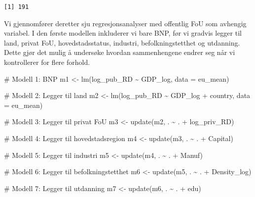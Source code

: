 \documentclass[
  letterpaper,
  DIV=11,
  numbers=noendperiod]{scrartcl}
\newenvironment{Shaded}{\begin{snugshade}}{\end{snugshade}}
\newcommand{\AttributeTok}[1]{\textcolor[rgb]{0.40,0.45,0.13}{#1}}
\newcommand{\CommentTok}[1]{\textcolor[rgb]{0.37,0.37,0.37}{#1}}
\newcommand{\FunctionTok}[1]{\textcolor[rgb]{0.28,0.35,0.67}{#1}}
\newcommand{\NormalTok}[1]{\textcolor[rgb]{0.00,0.23,0.31}{#1}}
\newcommand{\OtherTok}[1]{\textcolor[rgb]{0.00,0.23,0.31}{#1}}
\newcommand{\SpecialCharTok}[1]{\textcolor[rgb]{0.37,0.37,0.37}{#1}}
\begin{document}
\begin{verbatim}
[1] 191
\end{verbatim}

Vi gjennomfører deretter sju regresjonsanalyser med offentlig FoU som
avhengig variabel. I den første modellen inkluderer vi bare BNP, før vi
gradvis legger til land, privat FoU, hovedstadsstatus, industri,
befolkningstetthet og utdanning. Dette gjør det mulig å undersøke
hvordan sammenhengene endrer seg når vi kontrollerer for flere forhold.

\begin{Shaded}
\begin{Highlighting}[]
\CommentTok{\# Modell 1: BNP}
\NormalTok{m1 }\OtherTok{\textless{}{-}} \FunctionTok{lm}\NormalTok{(log\_pub\_RD }\SpecialCharTok{\textasciitilde{}}\NormalTok{ GDP\_log, }\AttributeTok{data =}\NormalTok{ eu\_mean)}

\CommentTok{\# Modell 2: Legger til land}
\NormalTok{m2 }\OtherTok{\textless{}{-}} \FunctionTok{lm}\NormalTok{(log\_pub\_RD }\SpecialCharTok{\textasciitilde{}}\NormalTok{ GDP\_log }\SpecialCharTok{+}\NormalTok{ country,}
         \AttributeTok{data =}\NormalTok{ eu\_mean)}

\CommentTok{\# Modell 3: Legger til privat FoU}
\NormalTok{m3 }\OtherTok{\textless{}{-}} \FunctionTok{update}\NormalTok{(m2, . }\SpecialCharTok{\textasciitilde{}}\NormalTok{ . }\SpecialCharTok{+}\NormalTok{ log\_priv\_RD)}

\CommentTok{\# Modell 4: Legger til hovedstadsregion}
\NormalTok{m4 }\OtherTok{\textless{}{-}} \FunctionTok{update}\NormalTok{(m3, . }\SpecialCharTok{\textasciitilde{}}\NormalTok{ . }\SpecialCharTok{+}\NormalTok{ Capital)}

\CommentTok{\# Modell 5: Legger til industri}
\NormalTok{m5 }\OtherTok{\textless{}{-}} \FunctionTok{update}\NormalTok{(m4, . }\SpecialCharTok{\textasciitilde{}}\NormalTok{ . }\SpecialCharTok{+}\NormalTok{ Manuf)}

\CommentTok{\# Modell 6: Legger til befolkningstetthet}
\NormalTok{m6 }\OtherTok{\textless{}{-}} \FunctionTok{update}\NormalTok{(m5, . }\SpecialCharTok{\textasciitilde{}}\NormalTok{ . }\SpecialCharTok{+}\NormalTok{ Density\_log)}

\CommentTok{\# Modell 7: Legger til utdanning}
\NormalTok{m7 }\OtherTok{\textless{}{-}} \FunctionTok{update}\NormalTok{(m6, . }\SpecialCharTok{\textasciitilde{}}\NormalTok{ . }\SpecialCharTok{+}\NormalTok{ edu)}
\end{Highlighting}
\end{Shaded}
\end{document}

